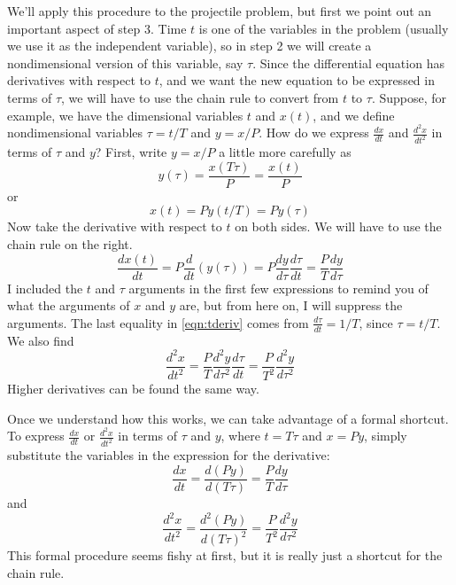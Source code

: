\documentclass[reqno]{immbook}
\numberwithin{equation}{chapter}
\numberwithin{question}{section}
\numberwithin{theorem}{chapter}
\numberwithin{figure}{chapter}
\theoremstyle{definition}
\begin{document}
We'll apply this procedure to the projectile problem,
but first we point out an important aspect of
step 3.
Time $t$ is one of the variables in the
problem (usually we use it as the independent
variable), so in step 2 we will create a nondimensional
version of this variable, say $\tau$.
Since the differential equation has derivatives
with respect to $t$, and we want the new equation
to be expressed in terms of $\tau$, we will have
to use the chain rule to convert from $t$ to
$\tau$. Suppose, for example, we have the dimensional variables
$t$ and $x(t)$, and we define nondimensional
variables $\tau = t/T$ and $y=x/P$.  How do we
express $\frac{dx}{dt}$ and $\frac{d^2x}{dt^2}$
in terms of $\tau$ and $y$?  First, write $y=x/P$
a little more carefully as
\begin{equation}
   y(\tau) = \frac{x(T\tau)}{P} = \frac{x(t)}{P} 
\end{equation}
or
\begin{equation}
  x(t) = Py(t/T) = Py(\tau)
\end{equation}
Now take the derivative with respect to $t$ on both sides.
We will have to use the chain rule on the right.
\begin{equation}
  \frac{dx(t)}{dt} = P \frac{d}{dt}\left(y(\tau)\right)= P \frac{dy}{d\tau} \frac{d\tau}{dt}
      = \frac{P}{T}\frac{dy}{d\tau}
  \label{eqn:tderiv}
\end{equation}
I included the $t$ and $\tau$ arguments in the first few expressions
to remind you of what the arguments of $x$ and $y$ are, but from here
on, I will suppress the arguments.
The last equality in \eqref{eqn:tderiv}
comes from $\frac{d\tau}{dt} = 1/T$, since $\tau = t/T$.
We also find
\begin{equation}
  \frac{d^2x}{dt^2} = \frac{P}{T} \frac{d^2y}{d\tau^2}\frac{d\tau}{dt}
     = \frac{P}{T^2}\frac{d^2y}{d\tau^2}
\end{equation}
Higher derivatives can be found the same way.

Once we understand how this works, we can take advantage of a formal
shortcut.  To express $\frac{dx}{dt}$ or $\frac{d^2x}{dt^2}$
in terms of $\tau$ and $y$, where $t = T\tau$ and $x = Py$, simply
substitute the variables in the expression for the derivative:
\begin{equation}
   \frac{dx}{dt} = \frac{d (Py)}{d(T\tau)} = \frac{P}{T}\frac{dy}{d\tau}
\end{equation}
and
\begin{equation}
   \frac{d^2x}{dt^2} = \frac{d^2(Py)}{d(T\tau)^2}
      = \frac{P}{T^2}\frac{d^2y}{d\tau^2}
\end{equation}
This formal procedure seems fishy at first, but it is really just
a shortcut for the chain rule.
\end{document}
